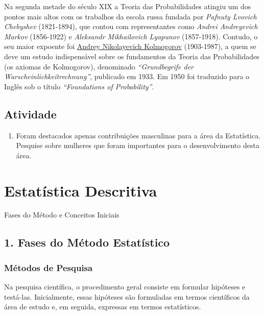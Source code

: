 \documentclass[
  letterpaper,
  DIV=11,
  numbers=noendperiod]{scrreprt}
\providecommand{\tightlist}{%
  \setlength{\itemsep}{0pt}\setlength{\parskip}{0pt}}\usepackage{longtable,booktabs,array}
\begin{document}
Na segunda metade do século XIX a Teoria das Probabilidades atingiu um
dos pontos mais altos com os trabalhos da escola russa fundada por
\emph{Pafnuty Lvovich Chebyshev} (1821-1894), que contou com
representantes como \emph{Andrei Andreyevich Markov} (1856-1922) e
\emph{Aleksandr Mikhailovich Lyapunov} (1857-1918). Contudo, o seu maior
expoente foi
\href{https://www.britannica.com/biography/Andrey-Nikolayevich-Kolmogorov}{Andrey
Nikolayevich Kolmogorov} (1903-1987), a quem se deve um estudo
indispensável sobre os fundamentos da Teoria das Probabilidades (os
axiomas de Kolmogorov), denominado \emph{``Grundbegrife der
Warscheinlichkeitrechnung''}, publicado em 1933. Em 1950 foi traduzido
para o Inglês sob o título \emph{``Foundations of Probability''}.

\section{Atividade}\label{atividade}

\begin{enumerate}
\def\labelenumi{\arabic{enumi}.}
\tightlist
\item
  Foram destacados apenas contribuições masculinas para a área da
  Estatística. Pesquise sobre mulheres que foram importantes para o
  desenvolvimento desta área.
\end{enumerate}


\chapter{Estatística Descritiva}\label{estatuxedstica-descritiva}

Fases do Método e Conceitos Iniciais

\hfill\break

\section{1. Fases do Método
Estatístico}\label{fases-do-muxe9todo-estatuxedstico}

\subsection{Métodos de Pesquisa}\label{muxe9todos-de-pesquisa}

Na pesquisa científica, o procedimento geral consiste em formular
hipóteses e testá-las. Inicialmente, essas hipóteses são formuladas em
termos científicos da área de estudo e, em seguida, expressas em termos
estatísticos.
\end{document}
